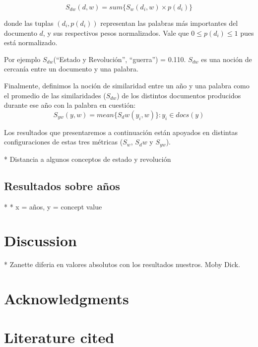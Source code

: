 \documentclass{pnastwo}
\begin{document}
\begin{article}
\begin{equation}
S_{dw}(d, w) = sum \{ S_w(d_i, w) \times p(d_i)  \} 
\end{equation}

donde las tuplas $(d_i , p(d_i))$ representan las palabras más importantes del documento $d$, y sus respectivos pesos normalizados. Vale que $0 \leq p(d_i) \leq 1$ pues está normalizado.

Por ejemplo $S_{dw}$(“Estado y Revolución”, “guerra”) = 0.110. $S_{dw}$ es una noción de cercanía entre un documento y una palabra.

Finalmente, definimos la noción de similaridad entre un año y una palabra como el promedio de las similaridades ($S_{dw}$) 
de los distintos documentos producidos durante ese año con la palabra en cuestión:
\begin{equation}
  S_{yw}(y, w) = mean \{ S_dw(y_i, w) \} : y_i \in docs(y) 
\end{equation}

Los resultados que presentaremos a continuaci\'on est\'an apoyados en distintas configuraciones de estas tres m\'etricas ($S_w$, $S_dw$ y $S_{yw}$).

% 



* Distancia a algunos conceptos de estado y revolución

\subsection{Resultados sobre años}
*
* x = {años}, y = {concept value}

\section{Discussion}
* Zanette diferia en valores absolutos con los resultados nuestros. Moby Dick. 

\section{Acknowledgments}

\section{Literature cited}




\end{article}
\end{document}

